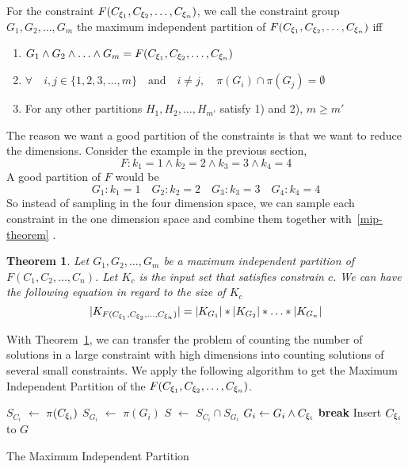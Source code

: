 \begin{definition}\label{Goodpartition}
   For the constraint $F(C_{{\xi}_{1}},C_{{\xi}_{2}},\ldots,C_{{\xi}_{n}})$,
   we call the constraint group
   $G_{1}, G_{2}, \ldots, G_{m}$
   the maximum independent partition of $F(C_{{\xi}_{1}},C_{{\xi}_{2}},\ldots,C_{{\xi}_{n}})$ iff
   \begin{enumerate}
      \item $G_{1} \land G_{2} \land \ldots \land G_{m} = F(C_{{\xi}_{1}},C_{{\xi}_{2}},\ldots,C_{{\xi}_{n}})$
      \item $\forall \quad i, j \in \{1, 2, 3, \ldots, m\} \quad \textrm{and} \quad 
            i \neq j, \quad \pi(G_{i}) \cap \pi(G_{j}) = \emptyset $
      \item For any other partitions  $H_{1}, H_{2}, \ldots, H_{m'}$ satisfy 1) and
            2), $m \geq m'$    
   \end{enumerate}
   
\end{definition}

The reason we want a good partition of the constraints is that we want to 
reduce the dimensions. Consider the example in the previous section,
$$F: {k_1} = 1\land{k_2} = 2\land{k_3} = 3\land{k_4} = 4$$
A good partition of $F$ would be
$$G_{1}: {k_1} = 1\quad G_{2}: {k_2} = 2\quad G_{3}: {k_3} = 3\quad G_{4}: {k_4} = 4$$     
So instead of sampling in the four dimension space, we can
sample each constraint in the one dimension space and combine them
together with~\ref{mip-theorem} .
\newtheorem{theorem}{Theorem}[section]
\label{mip-theorem}
\begin{theorem}
      \label{IndependentConstraint}
Let $G_{1}, G_{2}, \ldots, G_{m}$ be a maximum independent partition of $F(C_1,C_2,\ldots,C_n)$.
Let $K_c$ is the input set that satisfies constrain $c$. We can have the following
equation in regard to the size of $K_c$
$$|K_{F(C_{{\xi}_{1}},C_{{\xi}_{2}},\ldots,C_{{\xi}_{n}})}| = |K_{G_{1}}|*|K_{G_{2}}|*\ldots*|K_{G_{n}}|$$
\end{theorem}

With Theorem~\ref{IndependentConstraint}, we can transfer the problem of counting the number of 
solutions in a large constraint with high
dimensions into counting solutions of 
several small constraints. We apply the following algorithm to get the Maximum Independent Partition
of the $F(C_{{\xi}_{1}},C_{{\xi}_{2}},\ldots,C_{{\xi}_{n}})$.

\IncMargin{1em}
\begin{algorithm}[h]
\DontPrintSemicolon
{}
{
   $S_{C_i}$ $\leftarrow$ $\pi(C_{{\xi}_{i}})$ \;
   {
   $S_{G_i}$ $\leftarrow$ $\pi(G_{i})$ \;
   $S$ $\leftarrow$ $S_{C_i} \cap S_{G_i}$  \;
   {
      $G_{i} \leftarrow G_{i} \land C_{{\xi}_{i}}$ \;
      \textbf{break} \;
   }
   Insert $C_{{\xi}_{i}}$ to $G$
   }
}
\caption{The Maximum Independent Partition}
\end{algorithm}
\DecMargin{1em}

